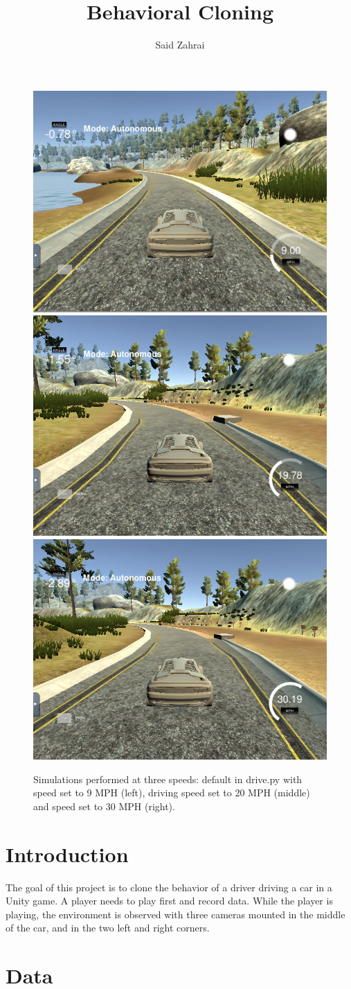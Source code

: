 \documentclass[12pt,a4paper]{article}
\author{Said Zahrai}
\title{Behavioral Cloning}
\begin{document}
	\maketitle
	
		\begin{figure}[H]
		\centering
		\includegraphics[width=0.3\linewidth]{writeup_figures/Speed_09}
		\includegraphics[width=0.3\linewidth]{writeup_figures/Speed_20}
		\includegraphics[width=0.3\linewidth]{writeup_figures/Speed_30}
		\caption{Simulations performed at three speeds: default in drive.py with speed set to 9 MPH (left), driving speed set to 20 MPH (middle) and speed set to 30 MPH (right).}
		\label{fig:simulations}
	\end{figure}
	
	\section{Introduction}
	The goal of this project is to clone the behavior of a driver driving a car in a Unity game. A player needs to play first and record data. While the player is playing, the environment is observed with three cameras mounted in the middle of the car, and in the two left and right corners.
	\section{Data}
\end{document}
